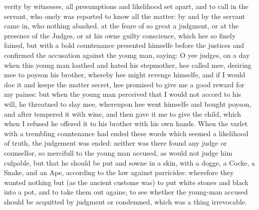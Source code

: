 verity by witnesses, all presumptions and likelihood set apart, and to call in
the servant, who onely was reported to know all the matter: by and by the
servant came in, who nothing abashed, at the feare of so great a judgment, or
at the presence of the Judges, or at his owne guilty conscience, which hee so
finely fained, but with a bold countenance presented himselfe before the
justices and confirmed the accusation against the young man, saying: O yee
judges, on a day when this young man loathed and hated his stepmother, hee
called mee, desiring mee to poyson his brother, whereby hee might revenge
himselfe, and if I would doe it and keepe the matter secret, hee promised to
give me a good reward for my paines: but when the young man perceived that I
would not accord to his will, he threatned to slay mee, whereupon hee went
himselfe and bought poyson, and after tempered it with wine, and then gave it
me to give the child, which when I refused he offered it to his brother with
his own hands. When the varlet with a trembling countenance had ended these
words which seemed a likelihood of truth, the judgement was ended: neither was
there found any judge or counsellor, so mercifull to the young man accused, as
would not judge him culpable, but that he should be put and sowne in a skin,
with a dogge, a Cocke, a Snake, and an Ape, according to the law against
parricides: wherefore they wanted nothing but (as the ancient custome was) to
put white stones and black into a pot, and to take them out againe, to see
whether the young-man accused should be acquitted by judgment or condemned,
which was a thing irrevocable.

